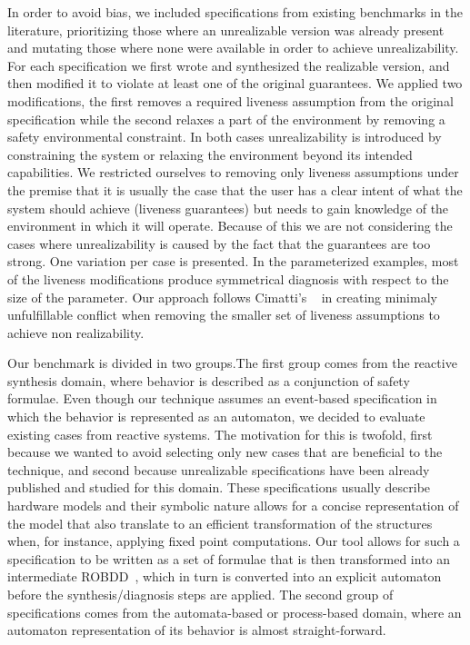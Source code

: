 In order to avoid bias, we included specifications from existing benchmarks in the literature, prioritizing those where an unrealizable version was already present and mutating those where none were available in order to achieve unrealizability. 
For each specification we first wrote and synthesized the realizable version, and then modified it
to violate at least one of the original guarantees. 
We applied two modifications, the first removes a required liveness assumption from the original specification while the second relaxes a part of the environment by removing a safety environmental constraint. 
In both cases unrealizability is introduced by constraining the system or relaxing the environment beyond its intended capabilities. We restricted ourselves to removing only liveness assumptions under the premise that it is usually the case that the user has a clear intent of what the system should achieve (liveness guarantees) but needs to gain knowledge of the environment in which it will operate.  Because of this we are not considering the cases where unrealizability is caused by the fact that the guarantees are too strong. One variation per case is presented. In the parameterized examples, most of the liveness modifications produce symmetrical diagnosis with respect to the size of the parameter. Our approach follows Cimatti's ~\cite{DBLP:conf/vmcai/CimattiRST08} in creating minimaly unfulfillable conflict when removing the smaller set of liveness assumptions to achieve non realizability.
 
Our benchmark is divided in two groups.The first group comes from the reactive synthesis domain, where behavior is described as a conjunction of safety formulae. Even though our technique assumes an event-based specification in which the behavior is represented as an automaton, we decided to evaluate existing cases from reactive systems. The motivation for this is twofold, first because we wanted to avoid selecting only new cases that are beneficial to the technique, and second because unrealizable specifications have been already published and studied for this domain.
These specifications usually describe hardware models and their symbolic nature allows for a concise representation of the model that also translate to an efficient transformation of the structures when, for instance, applying fixed point computations.  Our tool allows for such a specification to be written as a set of formulae that is then transformed into an intermediate ROBDD~\cite{brace1990efficient}, which in turn is converted into an explicit automaton before the synthesis/diagnosis steps are applied. The second group of specifications comes from the automata-based or process-based domain, where an automaton representation of its behavior is almost straight-forward.

